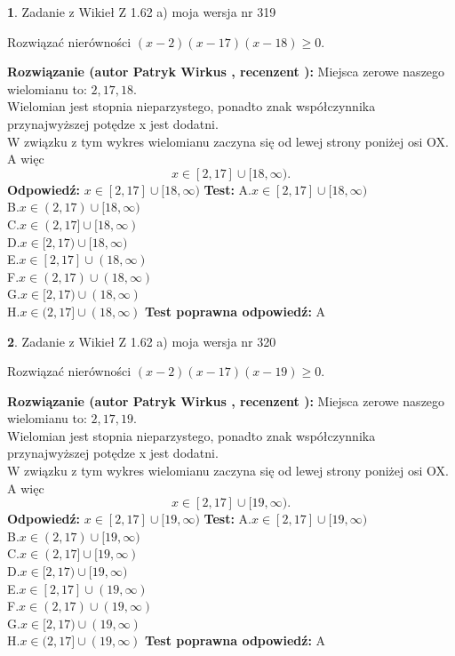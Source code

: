 \documentclass[12pt, a4paper]{article}
\theoremstyle{definition} %
\newtheorem{zad}{}
\newcommand{\zadStart}[1]{\begin{zad}#1\newline}
\newcommand{\zadStop}{\end{zad}}
\newcommand{\rozwStart}[2]{\noindent \textbf{Rozwiązanie (autor #1 , recenzent #2): }\newline}
\newcommand{\rozwStop}{\newline}
\newcommand{\odpStart}{\noindent \textbf{Odpowiedź:}\newline}
\newcommand{\odpStop}{\newline}
\newcommand{\testStart}{\noindent \textbf{Test:}\newline}
\newcommand{\testStop}{\newline}
\newcommand{\kluczStart}{\noindent \textbf{Test poprawna odpowiedź:}\newline}
\newcommand{\kluczStop}{\newline}
\begin{document}
\zadStart{Zadanie z Wikieł Z 1.62 a) moja wersja nr 319}

Rozwiązać nierówności $(x-2)(x-17)(x-18)\ge0$.
\zadStop
\rozwStart{Patryk Wirkus}{}
Miejsca zerowe naszego wielomianu to: $2, 17, 18$.\\
Wielomian jest stopnia nieparzystego, ponadto znak współczynnika przy\linebreak najwyższej potędze x jest dodatni.\\ W związku z tym wykres wielomianu zaczyna się od lewej strony poniżej osi OX. A więc $$x \in [2,17] \cup [18,\infty).$$
\rozwStop
\odpStart
$x \in [2,17] \cup [18,\infty)$
\odpStop
\testStart
A.$x \in [2,17] \cup [18,\infty)$\\
B.$x \in (2,17) \cup [18,\infty)$\\
C.$x \in (2,17] \cup [18,\infty)$\\
D.$x \in [2,17) \cup [18,\infty)$\\
E.$x \in [2,17] \cup (18,\infty)$\\
F.$x \in (2,17) \cup (18,\infty)$\\
G.$x \in [2,17) \cup (18,\infty)$\\
H.$x \in (2,17] \cup (18,\infty)$
\testStop
\kluczStart
A
\kluczStop



\zadStart{Zadanie z Wikieł Z 1.62 a) moja wersja nr 320}

Rozwiązać nierówności $(x-2)(x-17)(x-19)\ge0$.
\zadStop
\rozwStart{Patryk Wirkus}{}
Miejsca zerowe naszego wielomianu to: $2, 17, 19$.\\
Wielomian jest stopnia nieparzystego, ponadto znak współczynnika przy\linebreak najwyższej potędze x jest dodatni.\\ W związku z tym wykres wielomianu zaczyna się od lewej strony poniżej osi OX. A więc $$x \in [2,17] \cup [19,\infty).$$
\rozwStop
\odpStart
$x \in [2,17] \cup [19,\infty)$
\odpStop
\testStart
A.$x \in [2,17] \cup [19,\infty)$\\
B.$x \in (2,17) \cup [19,\infty)$\\
C.$x \in (2,17] \cup [19,\infty)$\\
D.$x \in [2,17) \cup [19,\infty)$\\
E.$x \in [2,17] \cup (19,\infty)$\\
F.$x \in (2,17) \cup (19,\infty)$\\
G.$x \in [2,17) \cup (19,\infty)$\\
H.$x \in (2,17] \cup (19,\infty)$
\testStop
\kluczStart
A
\kluczStop
\end{document}
